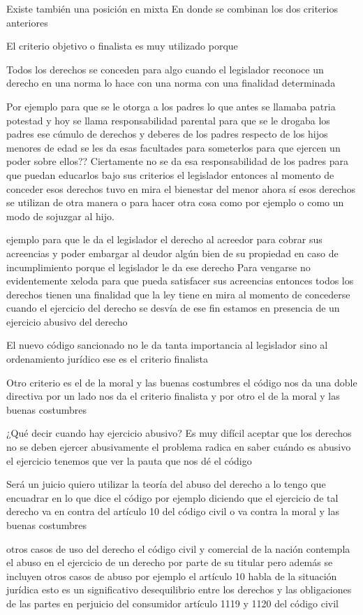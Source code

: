 \documentclass[12pt]{book}
\begin{document}
Existe también una posición en mixta En donde se combinan los dos criterios anteriores 


El criterio objetivo o finalista es muy utilizado porque

Todos los derechos se conceden para algo cuando el legislador reconoce un derecho en una norma lo hace con una norma con una finalidad determinada

Por ejemplo para que se le otorga a los padres lo que antes se llamaba patria potestad y hoy se llama responsabilidad parental para que se le drogaba los padres ese cúmulo de derechos y deberes de los padres respecto de los hijos menores de edad se les da esas facultades para someterlos para que ejercen un poder sobre ellos??
Ciertamente no se da esa responsabilidad de los padres para que puedan educarlos bajo sus criterios el legislador entonces al momento de conceder esos derechos tuvo en mira el bienestar del menor ahora sí esos derechos se utilizan de otra manera o para hacer otra cosa como por ejemplo o como un modo de sojuzgar al hijo.

ejemplo para que le da el legislador el derecho al acreedor para cobrar sus acreencias y poder embargar al deudor algún bien de su propiedad en caso de incumplimiento porque el legislador le da ese derecho
Para vengarse no evidentemente xeloda para que pueda satisfacer sus acreencias entonces todos los derechos tienen una finalidad que la ley tiene en mira al momento de concederse cuando el ejercicio del derecho se desvía de ese fin estamos en presencia de un ejercicio abusivo del derecho

El nuevo código sancionado no le da tanta importancia al legislador sino al ordenamiento jurídico ese es el criterio finalista

Otro criterio es el de la moral y las buenas costumbres el código nos da una doble directiva por un lado nos da el criterio finalista y por otro el de la moral y las buenas costumbres


¿Qué decir cuando hay ejercicio abusivo?
Es muy difícil aceptar que los derechos no se deben ejercer abusivamente el problema radica en saber cuándo es abusivo el ejercicio tenemos que ver la pauta que nos dé el código

Será un juicio quiero utilizar la teoría del abuso del derecho a lo tengo que encuadrar en lo que dice el código por ejemplo diciendo que el ejercicio de tal derecho va en contra del artículo 10 del código civil o va contra la moral y las buenas costumbres

otros casos de uso del derecho el código civil y comercial de la nación contempla el abuso en el ejercicio de un derecho por parte de su titular pero además se incluyen otros casos de abuso por ejemplo el artículo 10 habla de la situación jurídica
esto es un significativo desequilibrio entre los derechos y las obligaciones de las partes en perjuicio del consumidor artículo 1119 y 1120 del código civil
\end{document}
